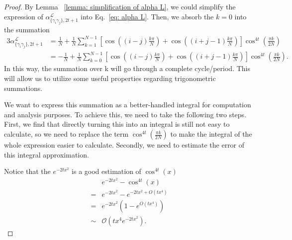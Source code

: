 \documentclass{article}
\newcommand{\alpl}{\alpha_{\{\gamma_i\gamma_j\}, 2t+1}^{\mathscr{L}}}
\begin{document}
\begin{proof}
By Lemma ~\ref{lemma: simplification of alpha L}, we could simplify the expression of $\alpl$ into Eq.~\eqref{eq: alpha L}. Then, we absorb the $k=0$ into the summation
\begin{equation}
\label{eq: zz anonymous 13}
\begin{aligned}
3\alpl & =\frac{1}{N}+\frac{1}{N} \sum_{k=1}^{N-1}\left[\cos \left((i-j) \frac{k \pi}{N}\right)+\cos \left((i+j-1) \frac{k \pi}{N}\right)\right] \cos ^{4 t}\left(\frac{\pi k}{2 N}\right) \\
& =-\frac{1}{N}+\frac{1}{N} \sum_{k=0}^{N-1}\left[\cos \left((i-j) \frac{k \pi}{N}\right)+\cos \left((i+j-1) \frac{k \pi}{N}\right)\right] \cos ^{4 t}\left(\frac{\pi k}{2 N}\right).
\end{aligned}
\end{equation}
In this way, the summation over k will go through a complete cycle/period. This will allow us to utilize some useful properties regarding trigonometric summations.

We want to express this summation as a better-handled integral for computation and analysis purposes. To achieve this, we need to take the following two steps. First, we find that directly turning this into an integral is still not easy to calculate, so we need to replace the term $\cos ^{4 t}\left(\frac{\pi k}{2 N}\right)$ to make the integral of the whole expression easier to calculate. Secondly, we need to estimate the error of this integral approximation.

Notice that the $e^{-2tx^2}$ is a good estimation of $\cos ^{4 t}\left(x\right)$
\begin{equation}
\begin{aligned}
& e^{-2 t x^2}-\cos ^{4 t}(x) \\
= & e^{-2 t x^2}-e^{-2 t x^2+O\left(t x^4\right)} \\
= & e^{-2 t x^2}\left(1-e^{O\left(t x^4\right)}\right) \\
\sim & \mathcal{O}\left(t x^4 e^{-2 t x^2}\right).
\end{aligned}
\end{equation}


\end{proof}
\end{document}

